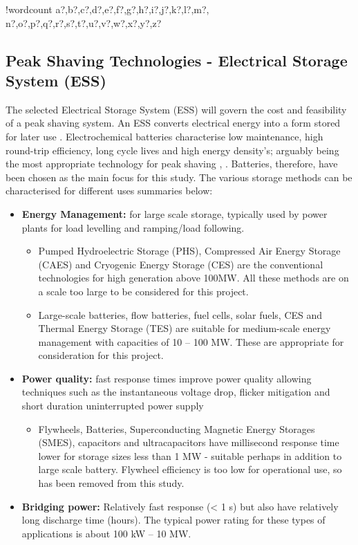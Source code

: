 \documentclass[fontsize=9.5pt]{extarticle}
\numberwithin{figure}{section} %
\providecommand{\tightlist}{%
  \setlength{\itemsep}{0pt}\setlength{\parskip}{0pt}}
\newcounter{words}
\newenvironment{counted}{%
  \setcounter{words}{0}
  \SearchList!{wordcount}{\stepcounter{words}}
    {a?,b?,c?,d?,e?,f?,g?,h?,i?,j?,k?,l?,m?,
    n?,o?,p?,q?,r?,s?,t?,u?,v?,w?,x?,y?,z?}
  \UndoBoundary{'}
  \SearchOrder{p;}}{%
  \StopSearching}
\begin{document}
\begin{counted}
\subsection{Peak Shaving Technologies - Electrical Storage System
(ESS)}\label{peak-shaving-technologies---electrical-storage-system-ess}

The selected Electrical Storage System (ESS) will govern the cost and
feasibility of a peak shaving system. An ESS converts electrical energy
into a form stored for later use \cite{Chen2009291}. Electrochemical
batteries characterise low maintenance, high round-trip efficiency, long
cycle lives and high energy density's; arguably being the most
appropriate technology for peak shaving \cite{liao2016a},
\cite{Dunn928}. Batteries, therefore, have been chosen as the main focus
for this study. The various storage methods can be characterised for
different uses summaries below:

\begin{itemize}
\tightlist
\item
  \textbf{Energy Management:} for large scale storage, typically used by
  power plants for load levelling and ramping/load following.

  \begin{itemize}
  \tightlist
  \item
    Pumped Hydroelectric Storage (PHS), Compressed Air Energy Storage
    (CAES) and Cryogenic Energy Storage (CES) are the conventional
    technologies for high generation above 100MW. All these methods are
    on a scale too large to be considered for this project.
  \item
    Large-scale batteries, flow batteries, fuel cells, solar fuels, CES
    and Thermal Energy Storage (TES) are suitable for medium-scale
    energy management with capacities of 10 -- 100 MW. These are
    appropriate for consideration for this project.
  \end{itemize}
\item
  \textbf{Power quality:} fast response times improve power quality
  allowing techniques such as the instantaneous voltage drop, flicker
  mitigation and short duration uninterrupted power supply

  \begin{itemize}
  \tightlist
  \item
    Flywheels, Batteries, Superconducting Magnetic Energy Storages
    (SMES), capacitors and ultracapacitors have millisecond response
    time lower for storage sizes less than 1 MW - suitable perhaps in
    addition to large scale battery. Flywheel efficiency is too low for
    operational use, so has been removed from this study.
  \end{itemize}
\item
  \textbf{Bridging power:} Relatively fast response (\textless{} 1 s)
  but also have relatively long discharge time (hours). The typical
  power rating for these types of applications is about 100 kW -- 10 MW.


\end{itemize}
\end{counted}
\end{document}
